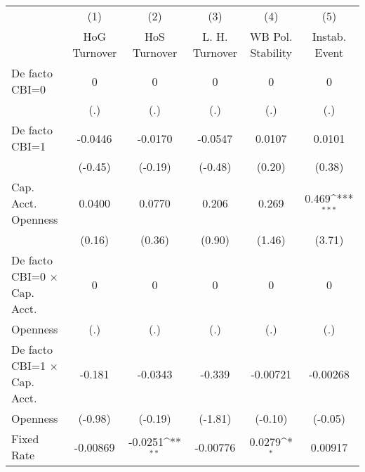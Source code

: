 \begin{table}[htbp]\centering
\def\sym#1{\ifmmode^{#1}\else\(^{#1}\)\fi}
\caption{\label{ikmultIndFEDF}}
\begin{tabular}{l*{5}{c}}
\toprule
                                        &\multicolumn{1}{c}{(1)}&\multicolumn{1}{c}{(2)}&\multicolumn{1}{c}{(3)}&\multicolumn{1}{c}{(4)}&\multicolumn{1}{c}{(5)}\\
                                        &\multicolumn{1}{c}{HoG Turnover}&\multicolumn{1}{c}{HoS Turnover}&\multicolumn{1}{c}{L. H. Turnover}&\multicolumn{1}{c}{WB Pol. Stability}&\multicolumn{1}{c}{Instab. Event}\\
\midrule
De facto CBI=0                          &        0         &        0         &        0         &        0         &        0         \\
                                        &      (.)         &      (.)         &      (.)         &      (.)         &      (.)         \\
\addlinespace
De facto CBI=1                          &  -0.0446         &  -0.0170         &  -0.0547         &   0.0107         &   0.0101         \\
                                        &  (-0.45)         &  (-0.19)         &  (-0.48)         &   (0.20)         &   (0.38)         \\
\addlinespace
Cap. Acct. Openness                     &   0.0400         &   0.0770         &    0.206         &    0.269         &    0.469\sym{***}\\
                                        &   (0.16)         &   (0.36)         &   (0.90)         &   (1.46)         &   (3.71)         \\
\addlinespace
De facto CBI=0 $\times$ Cap. Acct.      &        0         &        0         &        0         &        0         &        0         \\
Openness                                &      (.)         &      (.)         &      (.)         &      (.)         &      (.)         \\
\addlinespace
De facto CBI=1 $\times$ Cap. Acct.      &   -0.181         &  -0.0343         &   -0.339         & -0.00721         & -0.00268         \\
Openness                                &  (-0.98)         &  (-0.19)         &  (-1.81)         &  (-0.10)         &  (-0.05)         \\
\addlinespace
Fixed Rate                              & -0.00869         &  -0.0251\sym{**} & -0.00776         &   0.0279\sym{*}  &  0.00917         \\

\end{tabular}
\end{table}
